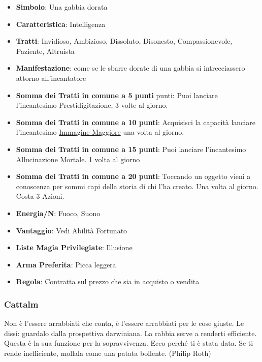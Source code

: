 \begin{multicols}{2}
\begin{itemize}[leftmargin=*] \setlength{\itemsep}{0pt}
\item \textbf{Simbolo}: Una gabbia dorata
\item \textbf{Caratteristica}: Intelligenza
\item \textbf{Tratti}: Invidioso, Ambizioso, Dissoluto, Disonesto, Compassionevole, Paziente, Altruista
\item \textbf{Manifestazione}: come se le sbarre dorate di una gabbia si intrecciassero attorno all'incantatore
\item \textbf{Somma dei Tratti in comune a 5 punti} punti: Puoi lanciare l'incantesimo Prestidigitazione, 3 volte al giorno.
\item \textbf{Somma dei Tratti in comune a 10 punti}: Acquisisci la capacità lanciare l'incantesimo \hyperlink{Immagine Maggiore}{Immagine Maggiore} una volta al giorno.
\item \textbf{Somma dei Tratti in comune a 15 punti}: Puoi lanciare l'incantesimo Allucinazione Mortale. 1 volta al giorno
\item \textbf{Somma dei Tratti in comune a 20 punti}: Toccando un oggetto vieni a conoscenza per sommi capi della storia di chi l'ha creato. Una volta al giorno. Costa 3 Azioni.
\item \textbf{Energia/N}: Fuoco, Suono
\item \textbf{Vantaggio}: Vedi Abilità Fortunato
\item \textbf{Liste Magia Privilegiate}: Illusione
\item \textbf{Arma Preferita}: Picca leggera
\item \textbf{Regola}: Contratta sul prezzo che sia in acquisto o vendita
\end{itemize}

\subsubsection{Cattalm}\label{cattalm}\hypertarget{cattalm}{}

\begin{changemargin}{0.3cm}{0.3cm}\begin{enfasi}{
Non è l'essere arrabbiati che conta, è l'essere arrabbiati per le cose giuste. Le dissi: guardalo dalla prospettiva darwiniana. La rabbia serve a renderti efficiente. Questa è la sua funzione per la sopravvivenza. Ecco perché ti è stata data. Se ti rende inefficiente, mollala come una patata bollente. (Philip Roth)
}\end{enfasi}\end{changemargin}\medskip


\end{multicols}
